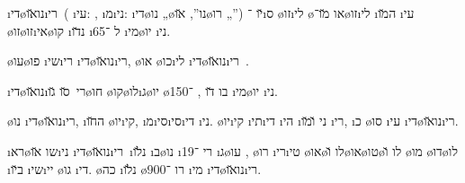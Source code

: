 
\newcommand{\level}{100}

\newcommand{\dinozaurim}{\i{די}\o{נו}\u{או}\i{רי}\s{ם}}



\colInvisibone

\dinozaurim\ ( \i{עי}: , \i{מ}\i{ני}:  \i{די}\o{נו} „\o{נו}”,  \u{או}\o{רו} „”) \u{יו} ־\i{ס}  \o{זו}\i{לי} \o{או} \u{מו}־\o{זו}\i{לי} \i{ה}\u{מו} \i{עי} \o{זו}\o{זו}\i{אי}\o{קו} \i{נ}\u{דו} \i{ל} ־65 \i{מי}\o{יו} \i{ני}.

\o{עו}\o{פו}   \i{שי}\i{רי}  \dinozaurim, \o{או}  \o{כו}\i{לי}  \dinozaurim\ .

\dinozaurim\ \u{סו} \u{גו}\o{חו} \o{קו}\o{לו}\i{ג}\o{יו} \o{בו}   \u{דו} ,  ־150 \i{מי}\o{יו} \i{ני}.

\o{נו} \dinozaurim, \i{ה}\u{חו} \o{יו}\i{קי}, \i{מ}\i{סי}\i{סי}\i{די} \i{ני}. \o{יו}\i{קי} \i{תי}\i{די} \i{הי} \i{ני} \u{ו}\u{מו} \i{רי}, \i{כ}  \o{סו} \i{עי} \dinozaurim.

\i{רא}\o{שו} \u{או}\i{ני}  \dinozaurim\ \i{נ}\u{לו} \i{ב}\o{נו} \i{רי}   ־19   \i{ג}\o{עו} , \o{רו} \i{רי}\i{טי}  \o{או}\o{לו} \u{ו}\o{או}\o{טו}\o{לו} \u{ו} \o{מו} \o{דו}\o{לו} \i{ב}\u{יו} \i{שי}\i{יי} \o{גו}  \i{די}.
 \o{כה} \i{נ}\u{לו} \o{רו} ־900 \i{מי} \dinozaurim.


